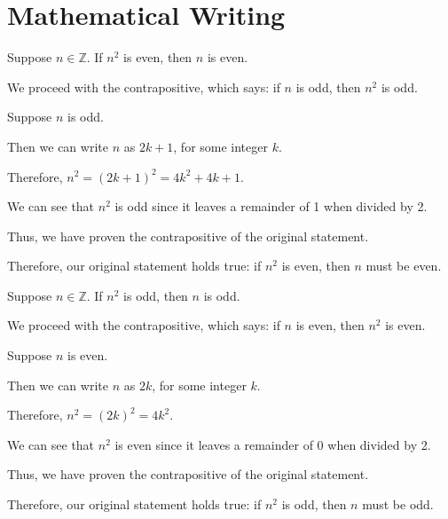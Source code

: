 \documentclass[openany, 12pt]{book}
\begin{document}
\section{Mathematical Writing}

\begin{exercise}{}{}
	Suppose $n \in \mathbb{Z}$. If $n^2$ is even, then $n$ is even.
	\begin{alist}
		\item We proceed with the contrapositive, which says: if $n$ is odd, then $n^2$ is
		odd.
		\item Suppose $n$ is odd.
		\item Then we can write $n$ as $2k + 1$, for some integer $k$.
		\item Therefore, $n^2 = (2k + 1)^2 = 4k^2 + 4k + 1$.
		\item We can see that $n^2$ is odd since it leaves a remainder of 1 when divided by 2.
		\item Thus, we have proven the contrapositive of the original
		statement.
		\item Therefore, our original statement holds true: if $n^2$ is even, then
		$n$ must be even.
	\end{alist}
\end{exercise}

\begin{exercise}{}{}
	Suppose $n \in \mathbb{Z}$. If $n^2$ is odd, then $n$ is odd.
	\begin{alist}
		\item We proceed with the contrapositive, which says: if $n$ is even, then $n^2$ is
		even.
		\item Suppose $n$ is even.
		\item Then we can write $n$ as $2k$, for some integer $k$.
		\item Therefore, $n^2 = (2k)^2 = 4k^2$.
		\item We can see that $n^2$ is even since it leaves a remainder of 0 when divided by 2.
		\item Thus, we have proven the contrapositive of the original
		statement.
		\item Therefore, our original statement holds true: if $n^2$ is odd, then
		$n$ must be odd.
	\end{alist}
\end{exercise}
\end{document}
